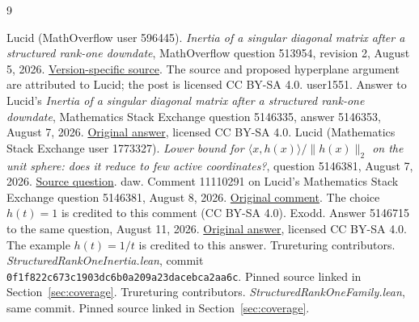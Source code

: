 \documentclass[11pt]{article}
\begin{document}
\begin{thebibliography}{9}\raggedright
{} Lucid (MathOverflow user 596445).
\emph{Inertia of a singular diagonal matrix after a structured rank-one
downdate}, MathOverflow question 513954, revision 2, August 5, 2026.
\href{https://mathoverflow.net/revisions/513954/2}{Version-specific source}.
The source and proposed hyperplane argument are attributed to Lucid;
the post is licensed CC BY-SA 4.0.
 user1551.
Answer to Lucid's \emph{Inertia of a singular diagonal matrix after a
structured rank-one downdate}, Mathematics Stack Exchange question
5146335, answer 5146353, August 7, 2026.
\href{https://math.stackexchange.com/a/5146353}{Original answer},
licensed CC BY-SA 4.0.
 Lucid (Mathematics Stack Exchange user 1773327).
\emph{Lower bound for $\langle x,h(x)\rangle/\|h(x)\|_2$ on the unit
sphere: does it reduce to few active coordinates?}, question 5146381,
August 7, 2026.
\href{https://math.stackexchange.com/questions/5146381}{Source question}.
 daw. Comment 11110291 on Lucid's Mathematics Stack Exchange
question 5146381, August 8, 2026.
\href{https://math.stackexchange.com/questions/5146381#comment11110291_5146381}{Original comment}.
The choice $h(t)=1$ is credited to this comment (CC BY-SA 4.0).
 Exodd. Answer 5146715 to the same question,
August 11, 2026.
\href{https://math.stackexchange.com/a/5146715}{Original answer},
licensed CC BY-SA 4.0. The example $h(t)=1/t$ is credited to this answer.
 Trureturing contributors.
\emph{StructuredRankOneInertia.lean}, commit
\texttt{0f1f822c673c1903dc6b0a209a23dacebca2aa6c}.
Pinned source linked in Section~\ref{sec:coverage}.
 Trureturing contributors.
\emph{StructuredRankOneFamily.lean}, same commit.
Pinned source linked in Section~\ref{sec:coverage}.
\end{thebibliography}
\end{document}
